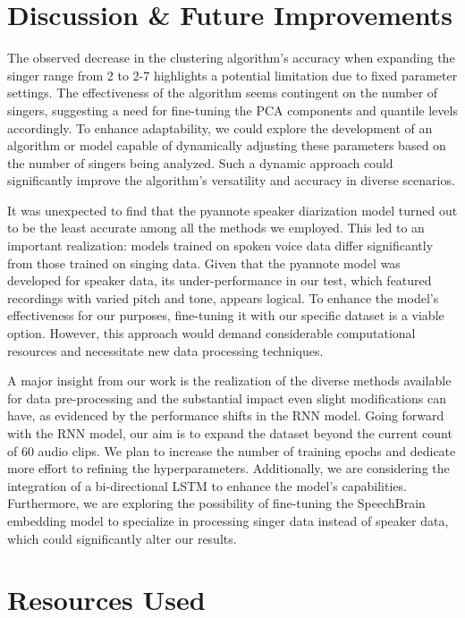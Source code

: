 \documentclass[conference]{IEEEtran}
\begin{document}
\section{Discussion \& Future Improvements}
    The observed decrease in the clustering algorithm's accuracy when expanding the singer range from 2 to 2-7 highlights a potential limitation due to fixed parameter settings. The effectiveness of the algorithm seems contingent on the number of singers, suggesting a need for fine-tuning the PCA components and quantile levels accordingly. To enhance adaptability, we could explore the development of an algorithm or model capable of dynamically adjusting these parameters based on the number of singers being analyzed. Such a dynamic approach could significantly improve the algorithm's versatility and accuracy in diverse scenarios.

    It was unexpected to find that the pyannote speaker diarization model turned out to be the least accurate among all the methods we employed. This led to an important realization: models trained on spoken voice data differ significantly from those trained on singing data. Given that the pyannote model was developed for speaker data, its under-performance in our test, which featured recordings with varied pitch and tone, appears logical. To enhance the model's effectiveness for our purposes, fine-tuning it with our specific dataset is a viable option. However, this approach would demand considerable computational resources and necessitate new data processing techniques.

    A major insight from our work is the realization of the diverse methods available for data pre-processing and the substantial impact even slight modifications can have, as evidenced by the performance shifts in the RNN model. Going forward with the RNN model, our aim is to expand the dataset beyond the current count of 60 audio clips. We plan to increase the number of training epochs and dedicate more effort to refining the hyperparameters. Additionally, we are considering the integration of a bi-directional LSTM to enhance the model's capabilities. Furthermore, we are exploring the possibility of fine-tuning the SpeechBrain embedding model to specialize in processing singer data instead of speaker data, which could significantly alter our results.

\section{Resources Used}
\end{document}
